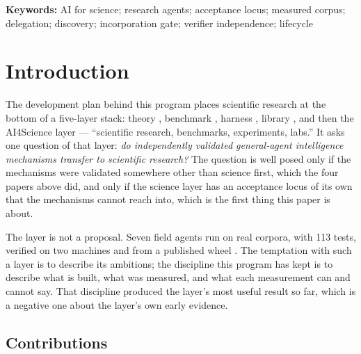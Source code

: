 \noindent\textbf{Keywords:} AI for science; research agents; acceptance locus; measured corpus; delegation; discovery; incorporation gate; verifier independence; lifecycle

\tableofcontents
\bigskip

\section{Introduction}\label{sec:intro}

The development plan behind this program places scientific research at the bottom of a five-layer stack: theory \citep{yang2026unified}, benchmark \citep{yang2026hilbenchpaper}, harness \citep{yang2026harness}, library \citep{yang2026library}, and then the AI4Science layer --- ``scientific research, benchmarks, experiments, labs.'' It asks one question of that layer: \emph{do independently validated general-agent intelligence mechanisms transfer to scientific research?} The question is well posed only if the mechanisms were validated somewhere other than science first, which the four papers above did, and only if the science layer has an acceptance locus of its own that the mechanisms cannot reach into, which is the first thing this paper is about.

The layer is not a proposal. Seven field agents run on real corpora, with 113 tests, verified on two machines and from a published wheel \citep{ai4science_research_agents}. The temptation with such a layer is to describe its ambitions; the discipline this program has kept is to describe what is built, what was measured, and what each measurement can and cannot say. That discipline produced the layer's most useful result so far, which is a negative one about the layer's own early evidence.

\subsection{Contributions}

